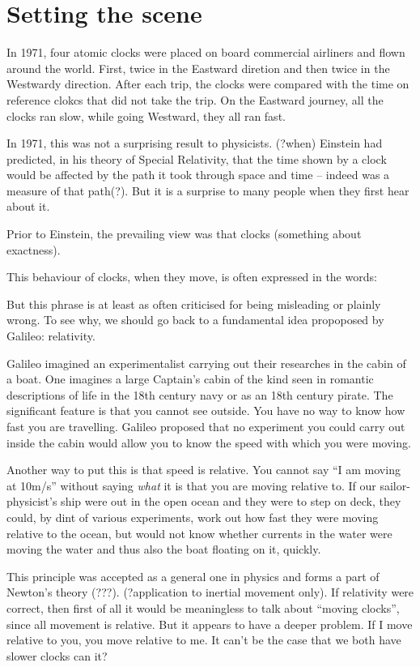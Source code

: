 \documentclass{report}
\begin{document}
\section*{Setting the scene}
In 1971, four atomic clocks were placed on board commercial airliners and flown around the world. First, twice in the Eastward diretion and then twice in the Westwardy direction. After each trip, the clocks were compared with the time on reference clokcs that did not take the trip. On the Eastward journey, all the clocks ran slow, while going Westward, they all ran fast.

In 1971, this was not a surprising result to physicists. (?when) Einstein had predicted, in his theory of Special Relativity, that the time shown by a clock would be affected by the path it took through space and time -- indeed was a measure of that path(?). But it is a surprise to many people when they first hear about it.

Prior to Einstein, the prevailing view was that clocks (something about exactness).

This behaviour of clocks, when they move, is often expressed in the words:


But this phrase is at least as often criticised for being misleading or plainly wrong. To see why, we should go back to a fundamental idea propoposed by Galileo: relativity.

Galileo imagined an experimentalist carrying out their researches in the cabin of a boat. One imagines a large Captain's cabin of the kind seen in romantic descriptions of life in the 18th century navy or as an 18th century pirate. The significant feature is that you cannot see outside. You have no way to know how fast you are travelling. Galileo proposed that no experiment you could carry out inside the cabin would allow you to know the speed with which you were moving.

Another way to put this is that speed is relative. You cannot say ``I am moving at 10m/s'' without saying {\em what} it is that you are moving relative to. If our sailor-physicist's ship were out in the open ocean and they were to step on deck, they could, by dint of various experiments, work out how fast they were moving relative to the ocean, but would not know whether currents in the water were moving the water and thus also the boat floating on it, quickly.

This principle was accepted as a general one in physics and forms a part of Newton's theory (???). (?application to inertial movement only). If relativity were correct, then first of all it would be meaningless to talk about ``moving clocks'', since all movement is relative. But it appears to have a deeper problem. If I move relative to you, you move relative to me. It can't be the case that we both have slower clocks can it?
\end{document}
